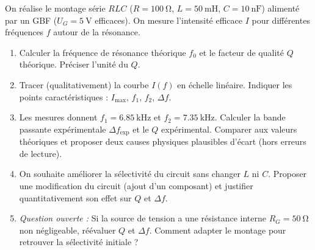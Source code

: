\documentclass[11pt]{article}
\begin{document}
\begin{exercice}
On réalise le montage série $RLC$ ($R = \SI{100}{\ohm}$, $L = \SI{50}{\milli\henry}$, $C = \SI{10}{\nano\farad}$) alimenté par un GBF ($U_G = \SI{5}{\volt}$ efficaces). On mesure l'intensité efficace $I$ pour différentes fréquences $f$ autour de la résonance.
\begin{enumerate}
    \item Calculer la fréquence de résonance théorique $f_0$ et le facteur de qualité $Q$ théorique. Préciser l'unité du $Q$.
    \item Tracer (qualitativement) la courbe $I(f)$ en échelle linéaire. Indiquer les points caractéristiques : $I_{\text{max}}$, $f_1$, $f_2$, $\Delta f$.
    \item Les mesures donnent $f_1 = \SI{6.85}{\kilo\hertz}$ et $f_2 = \SI{7.35}{\kilo\hertz}$. Calculer la bande passante expérimentale $\Delta f_{\text{exp}}$ et le $Q$ expérimental. Comparer aux valeurs théoriques et proposer deux causes physiques plausibles d'écart (hors erreurs de lecture).
    \item On souhaite améliorer la sélectivité du circuit sans changer $L$ ni $C$. Proposer une modification du circuit (ajout d'un composant) et justifier quantitativement son effet sur $Q$ et $\Delta f$.
    \item \textit{Question ouverte :} Si la source de tension a une résistance interne $R_G = \SI{50}{\ohm}$ non négligeable, réévaluer $Q$ et $\Delta f$. Comment adapter le montage pour retrouver la sélectivité initiale ?
\end{enumerate}
\end{exercice}
\end{document}
